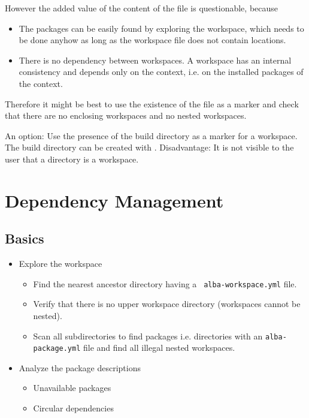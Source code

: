 However the added value of the content of the file is questionable, because
\begin{itemize}

\item The packages can be easily found by exploring the workspace, which needs
  to be done anyhow as long as the workspace file does not contain locations.

\item There is no dependency between workspaces. A workspace has an internal
  consistency and depends only on the context, i.e. on the installed packages
  of the context.
\end{itemize}

Therefore it might be best to use the existence of the file as a marker and
check that there are no enclosing workspaces and no nested workspaces.

An option: Use the presence of the build directory  as a
marker for a workspace. The build directory can be created with . Disadvantage: It is not visible to the user that a
directory is a workspace.




\section{Dependency Management}


\subsection{Basics}

\begin{itemize}

\item Explore the workspace
  \begin{itemize}

  \item Find the nearest ancestor directory having a {\tt\small
      alba-workspace.yml} file.

  \item Verify that there is no upper workspace directory (workspaces cannot
    be nested).

  \item Scan all subdirectories to find packages i.e. directories with an
    {\tt\small alba-package.yml} file and find all illegal nested workspaces.
  \end{itemize}

\item Analyze the package descriptions
  \begin{itemize}
  \item Unavailable packages
  \item Circular dependencies
  \end{itemize}
\end{itemize}

